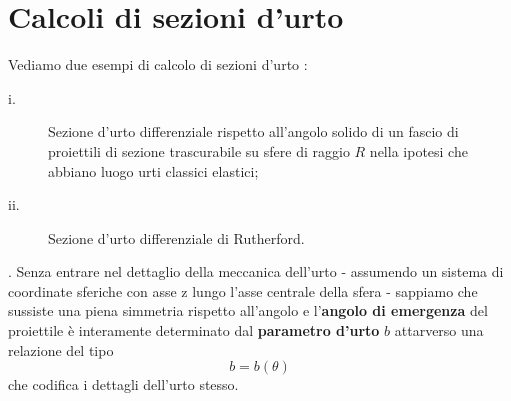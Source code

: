 \section{Calcoli di sezioni d'urto}\label{sec:calcoli-di-sezioni-d'urto}
Vediamo due esempi di calcolo di sezioni d'urto :
\begin{description}
	\item[i.] Sezione d'urto differenziale rispetto all'angolo solido di un fascio di proiettili di sezione trascurabile su sfere di raggio $R$ nella ipotesi che abbiano luogo urti classici elastici;
	\item[ii.] Sezione d'urto differenziale di Rutherford.
\end{description}

.
Senza entrare nel dettaglio della meccanica dell'urto - assumendo un sistema di coordinate sferiche con asse z lungo l'asse centrale della sfera - sappiamo che sussiste una piena simmetria rispetto all'angolo e l'\textbf{angolo di emergenza} del proiettile è interamente determinato dal \textbf{parametro d'urto} $b$ attarverso una relazione del tipo
\begin{equation}
	b = b(\theta)
	\label{eq:cross-sec-calc1}
\end{equation} che codifica i dettagli dell'urto stesso.

